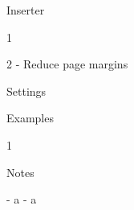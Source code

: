 Inserter {{{

1 {{{


\usepackage{geometry}


}}}
2 - Reduce page margins {{{


\usepackage[left=1cm, right=1cm, top=1cm, bottom=1cm]{geometry}



}}}

}}}
Settings {{{



}}}
Examples {{{

1 {{{



}}}

}}}
Notes {{{

- a
- a

}}}
